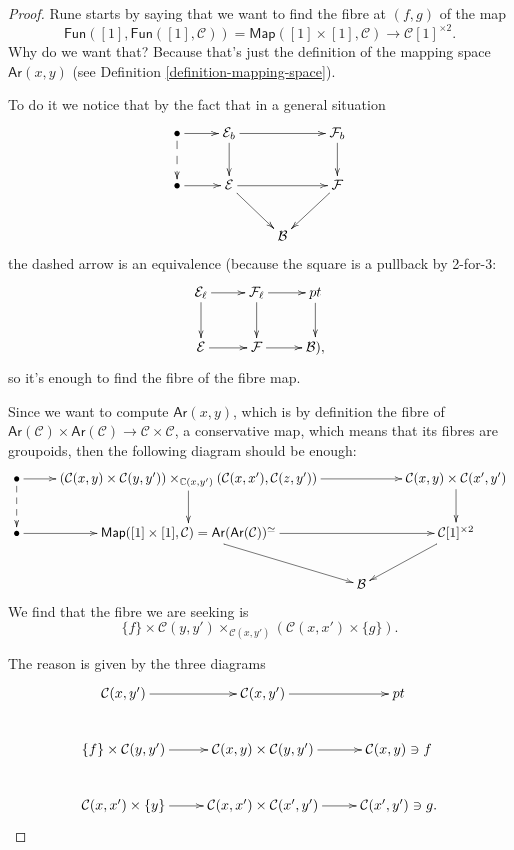\begin{proof}
Rune starts by saying that we want to find
the fibre at $(f,g)$ of the map
$$
\mathsf{Fun}([1],\mathsf{Fun}([1],\mathcal{C}))=
\mathsf{Map}([1]\times[1],\mathcal{C})\to\mathcal{C}[1]^{\times 2}.
$$
Why do we want that? Because that's just the definition
of the mapping space $\mathsf{Ar}(x,y)$ 
(see Definition \ref{definition-mapping-space}).

To do it we notice that by the fact that in a general situation
$$
\xymatrix{
\bullet\ar@{-->}[d]\ar[r]&\mathcal{E}_b\ar[d]\ar[rr]&& \mathcal{F}_b\ar[d]\\
\bullet \ar[r]&\mathcal{E} \ar[rd] \ar[rr] && \mathcal{F} \ar[dl] \\
&& \mathcal{B}
}
$$
the dashed arrow is
an equivalence (because the square is a pullback
by 2-for-3:
$$
\xymatrix{
\mathcal{E}_\ell\ar[r]\ar[d]&\mathcal{F}_\ell\ar[d]\ar[r]&pt\ar[d]\\
\mathcal{E}\ar[r]&\mathcal{F}\ar[r]&\mathcal{B}),
}
$$
so it's enough to find the fibre of the fibre map.

Since we want to compute $\mathsf{Ar}(x,y)$,
which is by definition the fibre of
$\mathsf{Ar}(\mathcal{C})\times\mathsf{Ar}(\mathcal{C})
\to \mathcal{C}\times\mathcal{C}$, a conservative map,
which means that its fibres are groupoids,
then the following diagram should be enough:
$$
\xymatrix{
\bullet\ar@{-->}[d]\ar[r]
&(\mathcal{C}(x,y)\times\mathcal{C}(y,y'))\times
_{\mathbb{C}(x,y')}
(\mathcal{C}(x,x'),\mathcal{C}(z,y'))
\ar[d]\ar[rr]
&& \mathcal{C}(x,y)\times \mathcal{C}(x',y')\ar[d]\\
\bullet \ar[r]
&\mathsf{Map}([1]\times[1],\mathcal{C})
=\mathsf{Ar}(\mathsf{Ar}(\mathcal{C}))^\simeq
\ar[rd] \ar[rr]
&&\mathcal{C}[1]^{\times 2}\ar[dl] \\
&& \mathcal{B}
}
$$
We find that the fibre we are seeking is
\begin{equation}
\label{equation-fibre}
\{f\}\times\mathcal{C}(y,y')
\times_{\mathcal{C}(x,y')}
(\mathcal{C}(x,x')\times \{g\}).
\end{equation}

\noindent
The reason is given by the three diagrams
$$
\xymatrix{
\mathcal{C}(x,y')\ar[r]
&\mathcal{C}(x,y')\ar[r]
&pt\\
\{f\}\times\mathcal{C}(y,y')\ar[r]
&\mathcal{C}(x,y)\times\mathcal{C}(y,y')\ar[r]
&\mathcal{C}(x,y)\ni f\\
\mathcal{C}(x,x')\times\{y\}\ar[r]
&\mathcal{C}(x,x')\times\mathcal{C}(x',y')\ar[r]
&\mathcal{C}(x',y')\ni g.
}
$$
\end{proof}

